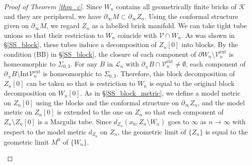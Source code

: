 \documentclass{amsart}
\theoremstyle{definition}
\numberwithin{figure}{section}
\numberwithin{equation}{section}
\def\ck{\mathcal{K}}
\def\cv{\mathcal{V}}
\def\eset{\emptyset}
\def\part{\partial}
\def\Int{\mathrm{Int}}
\def\sto{\rightarrow}
\def\Sg{\Sigma}
\def\Sg{\Sigma}
\begin{document}
\begin{proof}[Proof of Theorem \ref{thm_c}]
Since $W_n$ contains all geometrically finite bricks of $\ck$ and they are peripheral, we have $\part_\infty M\subset \part_\infty Z_n$.
Using the conformal structure given on $\partial_\infty M$, we regard $Z_n$ as a labelled brick manifold.
We can take tight tube unions so that their restriction to $W_n$ coincide with $\cv \cap W_n$.
As was shown in \S\ref{SS_block}, these tubes induce a decomposition of $Z_n[0]$  into blocks.
By the condition (BB) in \S \ref{SS_block}, the closure of each component of 
$\part W_n\setminus \cv_n^{\mathrm{ext}}$ is homeomorphic to $\Sg_{0,3}$.
For any $B$ in $\mathcal{L}_n$ with $\partial_\pm B\cap \cv_n^{\mathrm{ext}}\neq \eset$, each component of $\part_\pm B\setminus \Int \cv_n^{\mathrm{ext}}$ is homeomorphic to 
$\Sg_{0,3}$.
Therefore, this block decomposition of $Z_n[0]$ can be taken so that is restriction to $W_n$ is equal to 
the original block decomposition on $W_n[0]$.
As in \S \ref{SS_block_metric}, we  define a model metric on $Z_n[0]$ using the blocks and the conformal structure on $\partial_\infty Z_n$,
and the model metric on $Z_n[0]$ is extended to the one on $Z_n$ so that each component of 
$Z_n\setminus Z_n[0]$ is a Margulis tube.
Since $d_{Z_n}(x_0,Z_n\setminus W_n)$ goes to $\infty$ as $n\sto \infty$ with respect to the model
metric $d_{Z_n}$ on $Z_n$, the geometric limit of $\{Z_n\}$ is equal to the geometric limit $M^0$ of 
$\{W_n\}$.
\begin{figure}[hbtp]
\centering

\end{figure}
\end{proof}
\end{document}
